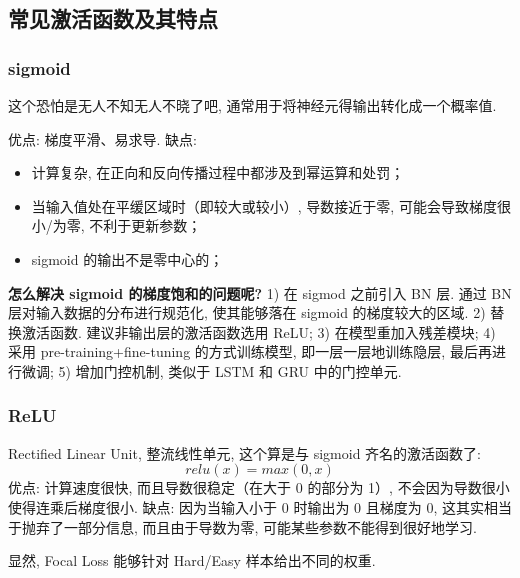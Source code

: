 \subsection{常见激活函数及其特点}
\subsubsection{sigmoid}
\begin{center}
\end{center}
这个恐怕是无人不知无人不晓了吧, 通常用于将神经元得输出转化成一个概率值. 

优点: 梯度平滑、易求导. 缺点: 
\begin{itemize}
	\item 计算复杂, 在正向和反向传播过程中都涉及到幂运算和处罚；
	
	\item 当输入值处在平缓区域时（即较大或较小）, 导数接近于零, 可能会导致梯度很小/为零, 不利于更新参数；
	
	\item sigmoid 的输出不是零中心的；
\end{itemize}

\textbf{怎么解决 sigmoid 的梯度饱和的问题呢?} 1) 在 sigmod 之前引入 BN 层. 通过 BN 层对输入数据的分布进行规范化, 使其能够落在 sigmoid 的梯度较大的区域. 2) 替换激活函数. 建议非输出层的激活函数选用 ReLU; 3) 在模型重加入残差模块; 4) 采用 pre-training+fine-tuning 的方式训练模型, 即一层一层地训练隐层, 最后再进行微调; 5) 增加门控机制, 类似于 LSTM 和 GRU 中的门控单元.

\subsubsection{ReLU}
Rectified Linear Unit, 整流线性单元, 这个算是与 sigmoid 齐名的激活函数了: 
$$
relu(x) = max(0, x)
$$
优点: 计算速度很快, 而且导数很稳定（在大于 0 的部分为 1）, 不会因为导数很小使得连乘后梯度很小. 缺点: 因为当输入小于 0 时输出为 0 且梯度为 0, 这其实相当于抛弃了一部分信息, 而且由于导数为零, 可能某些参数不能得到很好地学习. 

显然, Focal Loss 能够针对 Hard/Easy 样本给出不同的权重. 

